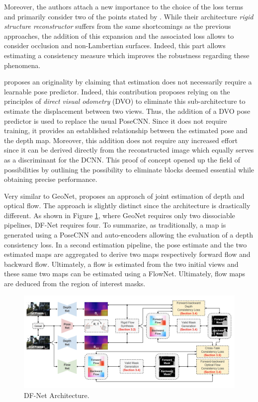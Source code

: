 Moreover, the authors attach a new importance to the choice of the loss terms and primarily consider two of the points stated by \cite{zhou2017unsupervised}. 
While their architecture \emph{rigid structure reconstructor} suffers from the same shortcomings as the previous approaches, the addition of this expansion and the associated loss allows to consider occlusion and non-Lambertian surfaces. Indeed, this part allows estimating a consistency measure which improves the robustness regarding these phenomena.


\cite{wang2018learning} proposes an originality by claiming that estimation does not necessarily require a learnable pose predictor. Indeed, this contribution proposes relying on the principles of \emph{direct visual odometry} (DVO) to eliminate this sub-architecture to estimate the displacement between two views.
Thus, the addition of a DVO \cite{steinbrucker2011real} pose predictor is used to replace the usual PoseCNN. Since it does not require training, it provides an established relationship between the estimated pose and the depth map. Moreover, this addition does not require any increased effort since it can be derived directly from the reconstructed image which equally serves as a discriminant for the DCNN. This proof of concept opened up the field of possibilities by outlining the possibility to eliminate blocks deemed essential while obtaining precise performance. 


Very similar to GeoNet\cite{yin2018geonet}, \cite{zou2018df} proposes an approach of joint estimation of depth and optical flow. The approach is slightly distinct since the architecture is drastically different. As shown in Figure \ref{illuzhou2018}, where GeoNet requires only two dissociable pipelines, DF-Net requires four. To summarize, as traditionally, a map is generated using a PoseCNN and auto-encoders allowing the evaluation of a depth consistency loss. In a second estimation pipeline, the pose estimate and the two estimated maps are aggregated to derive two maps respectively forward flow and backward flow. Ultimately, a flow is estimated from the two initial views and these same two maps can be estimated using a FlowNet. Ultimately, flow maps are deduced from the region of interest masks.

\begin{figure}[h]
	\centering
	\includegraphics[width=0.8\linewidth]{Figures/SOA/illuzhou2018.png}
	\caption[DF-Net Architecture.]{DF-Net \cite{zou2018df} Architecture.}
	\label{illuzhou2018}
\end{figure}

